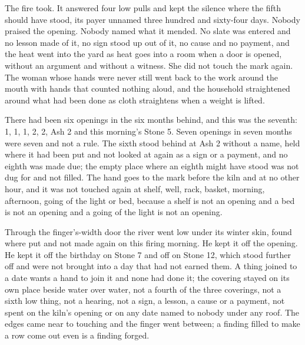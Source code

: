 The fire took. It answered four low pulls and kept the silence where the fifth should have stood, its payer unnamed three hundred and sixty-four days. Nobody praised the opening. Nobody named what it mended. No slate was entered and no lesson made of it, no sign stood up out of it, no cause and no payment, and the heat went into the yard as heat goes into a room when a door is opened, without an argument and without a witness. She did not touch the mark again. The woman whose hands were never still went back to the work around the mouth with hands that counted nothing aloud, and the household straightened around what had been done as cloth straightens when a weight is lifted.

There had been six openings in the six months behind, and this was the seventh:  1,  1,  1,  2,  2, Ash 2 and this morning's Stone 5. Seven openings in seven months were seven and not a rule. The sixth stood behind at Ash 2 without a name, held where it had been put and not looked at again as a sign or a payment, and no eighth was made due; the empty place where an eighth might have stood was not dug for and not filled. The hand goes to the mark before the kiln and at no other hour, and it was not touched again at shelf, well, rack, basket, morning, afternoon, going of the light or bed, because a shelf is not an opening and a bed is not an opening and a going of the light is not an opening.

\scenebreak

Through the finger's-width door the river went low under its winter skin, found where put and not made again on this firing morning. He kept it off the opening. He kept it off the birthday on Stone 7 and off  on Stone 12, which stood further off and were not brought into a day that had not earned them. A thing joined to a date wants a hand to join it and none had done it; the covering stayed on its own place beside water over water, not a fourth of the three coverings, not a sixth low thing, not a hearing, not a sign, a lesson, a cause or a payment, not spent on the kiln's opening or on any date named to nobody under any roof. The edges came near to touching and the finger went between; a finding filled to make a row come out even is a finding forged.

